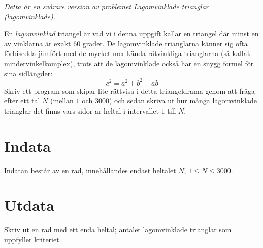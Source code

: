 \emph{Detta är en svårare version av problemet Lagomvinklade trianglar (lagomvinklade).}

En \emph{lagomvinklad} triangel är vad vi i denna uppgift kallar en triangel där minst en av vinklarna är exakt 60 grader. De lagomvinklade trianglarna känner sig ofta förbisedda jämfört med de mycket mer kända rätvinkliga trianglarna (så kallat mindervinkelkomplex), trots att de lagomvinklade också har en snygg formel för sina sidlängder:
\begin{equation*}
	c^2 = a^2 + b^2 - ab
\end{equation*}
Skriv ett program som skipar lite rättvisa i detta triangeldrama genom att fråga efter ett tal $N$ (mellan $1$ och $3000$) och sedan skriva ut hur många lagomvinklade trianglar det finns vars sidor är heltal i intervallet $1$ till $N$.

\section*{Indata}
Indatan består av en rad, innehållandes endast heltalet $N$, $1 \leq N \leq 3000$.

\section*{Utdata}
Skriv ut en rad med ett enda heltal; antalet lagomvinklade trianglar som uppfyller kriteriet.
